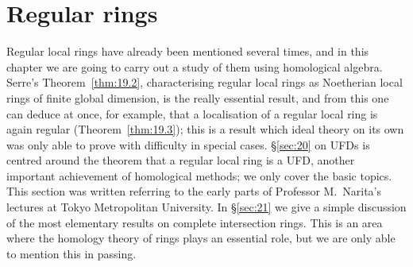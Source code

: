 \chapter{Regular rings}\label{ch:7}

Regular local rings have already been mentioned several times, and in
this chapter we are going to carry out a study of them using homological
algebra. Serre's Theorem~\ref{thm:19.2}, characterising regular local rings as Noetherian
local rings of finite global dimension, is the really essential result, and
from this one can deduce at once, for example, that a localisation of a
regular local ring is again regular (Theorem~\ref{thm:19.3}); this is a result which
ideal theory on its own was only able to prove with difficulty in special
cases. \S\ref{sec:20} on UFDs is centred around the theorem that a regular local
ring is a UFD, another important achievement of homological methods;
we only cover the basic topics. This section was written referring to the early
parts of Professor M.\ Narita's lectures at Tokyo Metropolitan University.
In \S\ref{sec:21} we give a simple discussion of the most elementary results on
complete intersection rings. This is an area where the homology theory of
rings plays an essential role, but we are only able to mention this in
passing.




